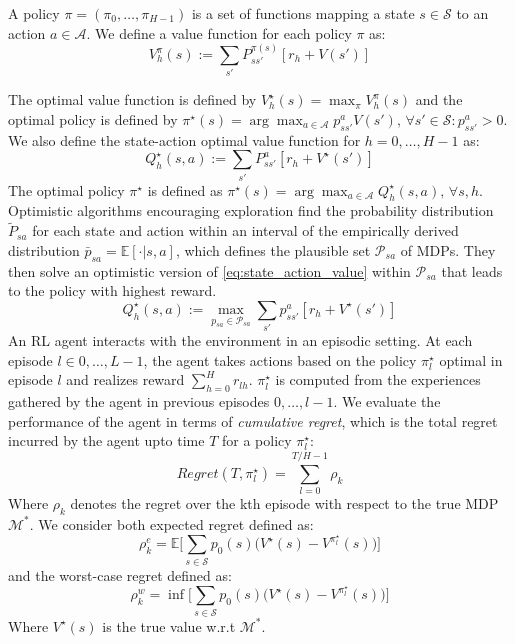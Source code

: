 \documentclass{article}
\newcommand{\E}{\mathbb{E}}
\newcommand{\opt}{^\star}
\newcommand{\states}{\mathcal{S}}
\newcommand{\actions}{\mathcal{A}}
\newcommand{\mdp}{\mathcal{M}}
\newcommand{\pset}{\mathcal{P}}
\theoremstyle{plain}
\theoremstyle{definition}
\begin{document}
A policy $\pi = (\pi_0,\ldots,\pi_{H-1})$ is a set of functions mapping a state $s\in\states$ to an action $a\in\actions$. We define a value function for each policy $\pi$ as:
\begin{equation} \label{eq:state_value}
V^\pi_h(s) := \sum_{s'} P^{\pi(s)}_{ss'} [ r_h + V(s') ]
\end{equation}

The optimal value function is defined by $V\opt_h(s) = \max_\pi V^\pi_h(s)$ and the optimal policy is defined by $\pi\opt(s) = \arg\max_{a\in\actions} p^a_{ss'}V(s') \text{, } \forall s'\in\states: p^a_{ss'}>0$. We also define the state-action optimal value function for $h=0,\ldots,H-1$ as:
\begin{equation} \label{eq:state_action_value}
Q\opt_h(s,a) := \sum_{s'}P^{a}_{ss'}[r_h + V\opt (s') ]
\end{equation}
The optimal policy $\pi\opt$ is defined as $\pi\opt(s) = \arg\max_{a\in\actions}Q\opt_h(s,a) \text{, } \forall s,h$. Optimistic algorithms encouraging exploration find the probability distribution $\tilde{P}_{sa}$ for each state and action within an interval of the empirically derived distribution $\bar{p}_{sa} = \E[\cdot|s,a]$, which defines the plausible set $\pset_{sa}$ of MDPs. They then solve an optimistic version
of \cref{eq:state_action_value} within $\pset_{sa}$ that leads to the policy with highest reward.
\begin{equation}
Q\opt_h(s,a) := \max_{p_{sa} \in \pset_{sa}} \sum_{s'}p^{a}_{ss'}[r_h + V\opt (s') ]
\end{equation}
An RL agent interacts with the environment in an episodic setting. At each episode $l\in 0,\ldots,L-1$, the agent takes actions based on the policy $\pi\opt_l$ optimal in episode $l$ and realizes reward $\sum_{h=0}^H r_{lh}$. $\pi\opt_l$ is computed from the experiences gathered by the agent in previous episodes $0,\ldots,l-1$. We evaluate the performance of the agent in terms of \emph{cumulative regret}, which is the total regret incurred by the agent upto time $T$ for a policy $\pi\opt_l$:
\[
Regret(T, \pi\opt_l) = \sum_{l=0}^{T/H-1} \rho_k
\]
Where $\rho_k$ denotes the regret over the kth episode with respect to the true MDP $\mdp^*$. We consider both expected regret defined as:
\[
\rho^e_k = \E\bigg[ \sum_{s\in\states} p_0(s)\big( V\opt(s) - V^{\pi\opt_l}(s) \big) \bigg]
\]
and the worst-case regret defined as:
\[
\rho^w_k = \inf\bigg[ \sum_{s\in\states} p_0(s)\big( V\opt(s) - V^{\pi\opt_l}(s) \big) \bigg]
\]
Where $V\opt(s)$ is the true value w.r.t $\mdp^*$.
\end{document}
